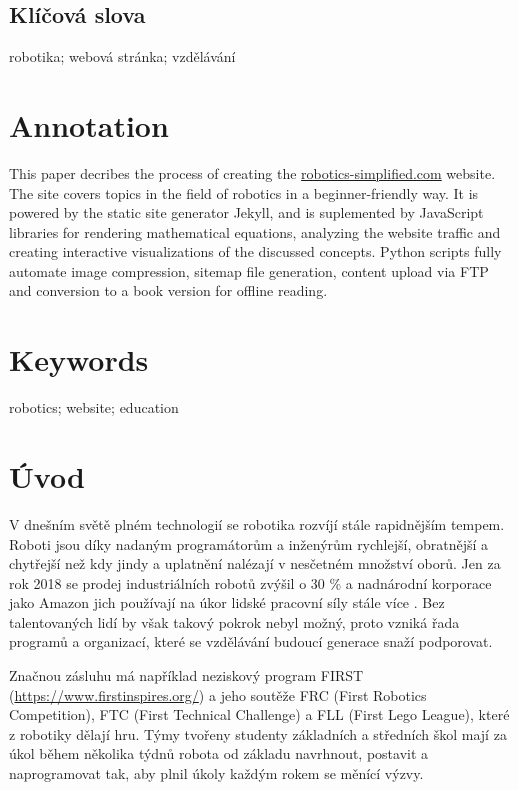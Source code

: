 \documentclass[a4paper, 12pt]{article}
\begin{document}
  \subsection*{\fontsize{18}{21.6}\selectfont\normalfont\textbf{Klíčová slova}}
  robotika; webová stránka; vzdělávání

  \section*{\normalfont\textbf{Annotation}}
  This paper decribes the process of creating the \url{robotics-simplified.com} website. The site covers topics in the field of robotics in a beginner-friendly way. It is powered by the static site generator Jekyll, and is suplemented by JavaScript libraries for rendering mathematical equations, analyzing the website traffic and creating interactive visualizations of the discussed concepts. Python scripts fully automate image compression, sitemap file generation, content upload via FTP and conversion to a book version for offline reading.

  \section*{\normalfont\textbf{Keywords}}
  robotics; website; education

  \newpage

  \setcounter{savepage}{\value{page}}%

  \tableofcontents

  \newpage

  \section{Úvod}
  V dnešním světě plném technologií se robotika rozvíjí stále rapidnějším tempem. Roboti jsou díky nadaným programátorům a inženýrům rychlejší, obratnější a chytřejší než kdy jindy a uplatnění nalézají v nesčetném množství oborů. Jen za rok 2018 se prodej industriálních robotů zvýšil o 30 \% \cite{industrial-robot-growth} a nadnárodní korporace jako Amazon jich používají na úkor lidské pracovní síly stále více \cite{amazon-hiring}. Bez talentovaných lidí by však takový pokrok nebyl možný, proto vzniká řada programů a organizací, které se vzdělávání budoucí generace snaží podporovat.

  Značnou zásluhu má například neziskový program FIRST (\url{https://www.firstinspires.org/}) a jeho soutěže FRC (First Robotics Competition), FTC (First Technical Challenge) a FLL (First Lego League), které z robotiky dělají hru. Týmy tvořeny studenty základních a středních škol mají za úkol během několika týdnů robota od základu navrhnout, postavit a naprogramovat tak, aby plnil úkoly každým rokem se měnící výzvy.
\end{document}
